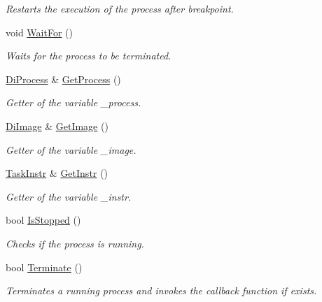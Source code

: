 \begin{DoxyCompactItemize}
\begin{DoxyCompactList}\small\item\em Restarts the execution of the process after breakpoint. \end{DoxyCompactList}\item 
\hypertarget{class_task_a0c7dd0bccd7f0ef1c21c5813c3f405a5}{void \hyperlink{class_task_a0c7dd0bccd7f0ef1c21c5813c3f405a5}{Wait\-For} ()}\label{class_task_a0c7dd0bccd7f0ef1c21c5813c3f405a5}

\begin{DoxyCompactList}\small\item\em Waits for the process to be terminated. \end{DoxyCompactList}\item 
\hyperlink{class_di_process}{Di\-Process} \& \hyperlink{class_task_ab62e2702d3e95ea5f9ca9c2c15191929}{Get\-Process} ()
\begin{DoxyCompactList}\small\item\em Getter of the variable \-\_\-process. \end{DoxyCompactList}\item 
\hyperlink{class_di_image}{Di\-Image} \& \hyperlink{class_task_af3d3e0f8585121ebfea01168bbda467e}{Get\-Image} ()
\begin{DoxyCompactList}\small\item\em Getter of the variable \-\_\-image. \end{DoxyCompactList}\item 
\hyperlink{class_task_instr}{Task\-Instr} \& \hyperlink{class_task_a5d4738dd77fc65f19ed8e976c70e1256}{Get\-Instr} ()
\begin{DoxyCompactList}\small\item\em Getter of the variable \-\_\-instr. \end{DoxyCompactList}\item 
bool \hyperlink{class_task_ac499ecac78bddd28affec97159b2a3af}{Is\-Stopped} ()
\begin{DoxyCompactList}\small\item\em Checks if the process is running. \end{DoxyCompactList}\item 
bool \hyperlink{class_task_ad2c779f5d3b27466f16563737bce3fdc}{Terminate} ()
\begin{DoxyCompactList}\small\item\em Terminates a running process and invokes the callback function if exists. \end{DoxyCompactList}\item 

\end{DoxyCompactItemize}
